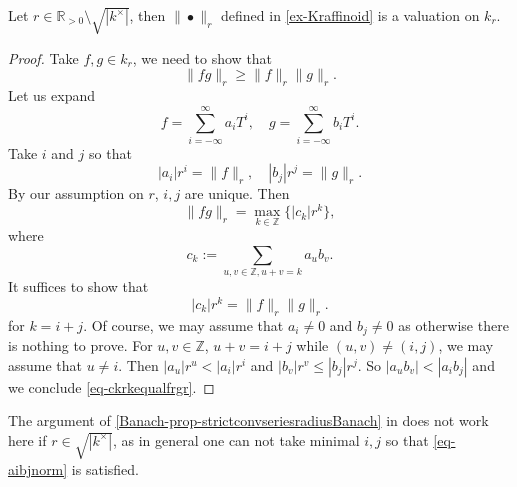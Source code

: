 \begin{proposition}
    Let $r\in \mathbb{R}_{>0}\setminus \sqrt{|k^{\times}|}$, then $\|\bullet\|_r$ defined in \cref{ex-Kraffinoid} is a valuation on $k_r$.
\end{proposition}
\begin{proof}
    Take $f,g\in k_r$, we need to show that
    \[
      \|fg\|_r\geq \|f\|_r\|g\|_r.  
    \]
    Let us expand
    \[
      f=\sum_{i=-\infty}^{\infty} a_i T^i,\quad   g=\sum_{i=-\infty}^{\infty} b_i T^i.
    \]
    Take $i$ and $j$ so that
    \begin{equation}\label{eq-aibjnorm}
      |a_i|r^i=\|f\|_r,\quad |b_j|r^j=\|g\|_r.  
    \end{equation}
    By our assumption on $r$, $i,j$ are unique.
    Then
    \[
      \|fg\|_r=\max_{k\in \mathbb{Z}}\{ |c_k|r^k\},
    \]
    where 
    \[
      c_k:=\sum_{u,v\in \mathbb{Z},u+v=k}a_ub_v.  
    \]
    It suffices to show that
    \begin{equation}\label{eq-ckrkequalfrgr}
        |c_k|r^k=\|f\|_r\|g\|_r.
    \end{equation}
    for $k=i+j$. Of course, we may assume that $a_i\neq 0$ and $b_j\neq 0$ as otherwise there is nothing to prove.
    For $u,v\in \mathbb{Z}$, $u+v=i+j$ while $(u,v)\neq (i,j)$, we may assume that $u\neq i$. Then $|a_u|r^u < |a_i|r^i$ and $|b_v|r^v\leq |b_j|r^j$. So $|a_ub_v|< |a_ib_j|$ and we conclude \eqref{eq-ckrkequalfrgr}.
\end{proof}
\begin{remark}
    The argument of \cref{Banach-prop-strictconvseriesradiusBanach} in  does not work here if $r\in \sqrt{|k^{\times}|}$, as in general one can not take minimal $i,j$ so that \eqref{eq-aibjnorm} is satisfied.
\end{remark}



